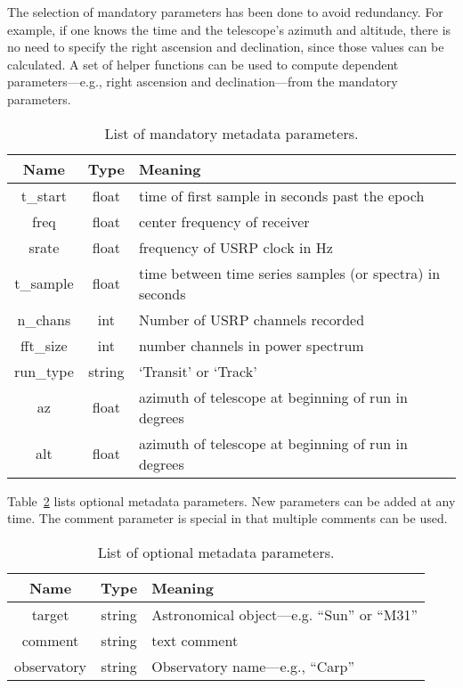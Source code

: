 \documentclass[12pt]{article}
\begin{document}
 The selection of mandatory parameters has been done to avoid redundancy.   For example, if one knows the time and the telescope's azimuth and altitude, there is no need to specify the right 
ascension and declination, since those values can be calculated.    A set of helper functions 
can be used to compute dependent parameters---e.g., right ascension and declination---from the mandatory parameters.   
 
 \begin{table}[htbp] 
 \caption{List of mandatory metadata parameters.}
 \label{TAB1}
 \begin{center}
 \begin{tabular}{| c | c|  l |}
 \hline 
 Name & Type & Meaning \\
 \hline  \hline
t\_start        & float   & time of first sample in seconds past the epoch \\
freq      & float   & center frequency of receiver \\
srate       & float   & frequency of USRP clock in Hz \\
t\_sample     & float   & time between time series samples (or spectra) in seconds \\
n\_chans       & int  & Number of USRP channels recorded \\
fft\_size       & int     &  number channels in power spectrum \\
run\_type     & string & `Transit' or `Track' \\
az                & float  & azimuth of telescope at beginning of run in degrees \\
alt                & float  & azimuth of telescope at beginning of run in degrees \\
\hline
\end{tabular}
\end{center}
\end{table}
 
 Table~\ref{TAB2} lists optional metadata parameters.    New parameters can be added at any time.   The comment parameter is special in that multiple comments can be used.   
 
  \begin{table}[htbp] 
 \caption{List of optional metadata parameters.}
 \label{TAB2}
 \begin{center}
 \begin{tabular}{| c | c|  l |}
 \hline 
 Name & Type & Meaning \\
 \hline  \hline
target      & string   & Astronomical object---e.g. ``Sun'' or ``M31''  \\
comment & string & text comment \\
observatory & string & Observatory name---e.g., ``Carp'' \\
\hline
\end{tabular}
\end{center}
\end{table}
 



\end{document}
